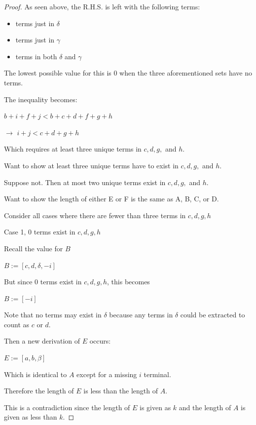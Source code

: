 \documentclass[manuscript]{acmart}
\begin{document}
\begin{proof}
        As seen above, the R.H.S. is left with the following terms:
        \begin{itemize}
            \item terms just in $\delta$
            \item terms just in $\gamma$
            \item terms in both $\delta$ and $\gamma$
        \end{itemize}
        
        The lowest possible value for this is 0 when the three aforementioned sets
        have no terms.

        The inequality becomes:

        $b + i + f + j < b + c + d + f + g + h$

        $\rightarrow$ $i + j < c + d + g + h$

        Which requires at least three unique terms in $c, d, g,$ and $h$.

        Want to show at least three unique terms have to exist in 
        $c, d, g,$ and $h$.

        Suppose not. Then at most two unique terms exist in $c, d, g,$ and $h$.

        Want to show the length of either E or F is the same as A, B, C, or D.

        Consider all cases where there are fewer than three terms in {$c, d, g, h$}

        Case 1, 0 terms exist in {$c, d, g, h$}

        Recall the value for $B$

        $B := [c, d, \delta, -i]$

        But since 0 terms exist in {$c, d, g, h$}, this becomes

        $B := [-i]$

        Note that no terms may exist in $\delta$ because any terms
        in $\delta$ could be extracted to count as $c$ or $d$.

        Then a new derivation of $E$ occurs:

        $E := [a, b, \beta]$

        Which is identical to $A$ except for a missing $i$ terminal.

        Therefore the length of $E$ is less than the length of $A$.

        This is a contradiction since the length of $E$ is given as $k$
        and the length of $A$ is given as less than $k$.


\end{proof}
\end{document}
